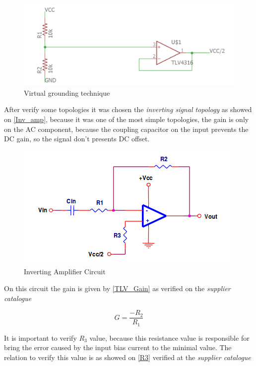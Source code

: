 \begin{figure}[!htpb]
\centering
\caption{Virtual grounding technique}
\label{virtual}
\includegraphics[scale=0.3]{images/virtual}
\end{figure}

After verify some topologies it was chosen the \textit{inverting signal topology} \cite{OpAmps} as showed on \autoref{Inv_amp}, because it was one of the most simple topologies, the
gain is only on the AC component, because the coupling capacitor on the input prevents the DC gain, so the signal don't presents
DC offset.

\begin{figure}[!htpb]
\centering
\caption{Inverting Amplifier Circuit}
\label{Inv_amp}
\includegraphics[scale=1]{images/TLV_Gain}
\end{figure}

On this circuit the gain is given by \autoref{TLV_Gain} as verified on the \textit{supplier catalogue} \cite{OpAmps}

\begin{equation}
\label{TLV_Gain}
G=\frac{-R_2}{R_1}
\end{equation}

It is important to verify $R_3$ value, because this resistance value is responsible for bring the error caused by the
input bias current to the minimal value. The relation to verify this value is as showed on \autoref{R3} verified at
the \textit{supplier catalogue} \cite{OpAmps}

